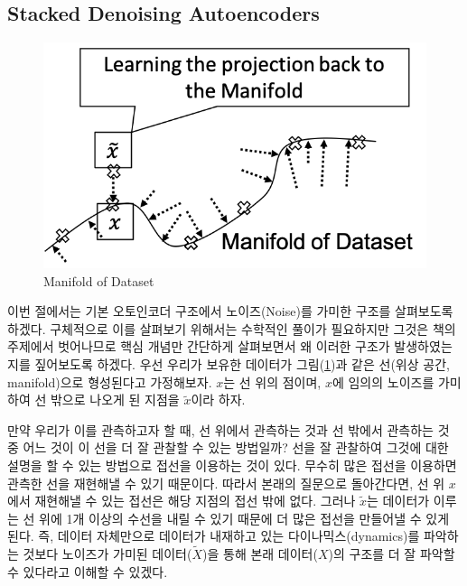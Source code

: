 \documentclass[draft=false]{oblivoir}
\begin{document}
\subsection{Stacked Denoising Autoencoders}
\begin{figure}[ht] \centering
  \includegraphics[scale=0.5]{fig4.png}
  \caption{Manifold of Dataset}
  \label{fig:17-4}
\end{figure}
이번 절에서는 기본 오토인코더 구조에서 노이즈(Noise)를 가미한 구조를 살펴보도록 하겠다. 구체적으로 이를 살펴보기 위해서는 수학적인 풀이가 필요하지만 그것은 책의 주제에서 벗어나므로 핵심 개념만 간단하게 살펴보면서 왜 이러한 구조가 발생하였는지를 짚어보도록 하겠다. 우선 우리가 보유한 데이터가 그림(\ref{fig:17-4})과 같은 선(위상 공간, manifold)으로 형성된다고 가정해보자. $x$는 선 위의 점이며, $x$에 임의의 노이즈를 가미하여 선 밖으로 나오게 된 지점을 $\tilde{x}$이라 하자.

만약 우리가 이를 관측하고자 할 때, 선 위에서 관측하는 것과 선 밖에서 관측하는 것 중 어느 것이 이 선을 더 잘 관찰할 수 있는 방법일까? 선을 잘 관찰하여 그것에 대한 설명을 할 수 있는 방법으로 접선을 이용하는 것이 있다. 무수히 많은 접선을 이용하면 관측한 선을 재현해낼 수 있기 때문이다. 따라서 본래의 질문으로 돌아간다면, 선 위 $x$에서 재현해낼 수 있는 접선은 해당 지점의 접선 밖에 없다. 그러나 $\tilde{x}$는 데이터가 이루는 선 위에 1개 이상의 수선을 내릴 수 있기 때문에 더 많은 접선을 만들어낼 수 있게 된다. 즉, 데이터 자체만으로 데이터가 내재하고 있는 다이나믹스(dynamics)를 파악하는 것보다 노이즈가 가미된 데이터($\tilde{X}$)을 통해 본래 데이터($X$)의 구조를 더 잘 파악할 수 있다라고 이해할 수 있겠다.
\end{document}

